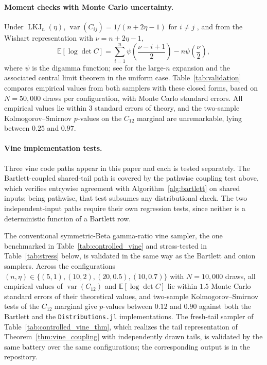 \documentclass[12pt,english]{article}
\theoremstyle{plain} %
\theoremstyle{definition} %
\theoremstyle{remark} %
\newcommand{\xthm}[2]{Theorem~\ref{#1}}
\newcommand{\xalg}[2]{Algorithm~\ref{#1}}
\newcommand{\xtab}[2]{Table~\ref{#1}}
\newcommand{\xtab}[2]{Table~#2 of the supplementary material}
\begin{document}
\paragraph{Moment checks with Monte Carlo uncertainty.}
Under $\operatorname{LKJ}_n(\eta)$, $\operatorname{var}(C_{ij})=1/(n+2\eta-1)$ for $i\neq j$ \citep[Proposition~1]{LewandowskiKurowickaJoe:2009}, and from the Wishart representation with $\nu=n+2\eta-1$,
$$
\mathbb{E}[\log\det C]=\sum_{i=1}^n\psi\left(\frac{\nu-i+1}{2}\right)-n\psi\left(\frac{\nu}{2}\right),
$$
where $\psi$ is the digamma function; see \citet{Hansen:CorrelationMatrix} for the large-$n$ expansion and the associated central limit theorem in the uniform case. Table~\ref{tab:validation} compares empirical values from both samplers with these closed forms, based on $N=50{,}000$ draws per configuration, with Monte Carlo standard errors. All empirical values lie within $3$ standard errors of theory, and the two-sample Kolmogorov--Smirnov $p$-values on the $C_{12}$ marginal are unremarkable, lying between $0.25$ and $0.97$.

\paragraph{Vine implementation tests.}
Three vine code paths appear in this paper and each is tested separately. The Bartlett-coupled shared-tail path is covered by the pathwise coupling test above, which verifies entrywise agreement with \xalg{alg:bartlett}{1} on shared inputs; being pathwise, that test subsumes any distributional check. The two independent-input paths require their own regression tests, since neither is a deterministic function of a Bartlett row.

The conventional symmetric-Beta gamma-ratio vine sampler, the one benchmarked in \xtab{tab:controlled_vine}{4} and stress-tested in Table~\ref{tab:stress} below, is validated in the same way as the Bartlett and onion samplers. Across the configurations $(n,\eta)\in\{(5,1),(10,2),(20,0.5),(10,0.7)\}$ with $N=10{,}000$ draws, all empirical values of $\operatorname{var}(C_{12})$ and $\mathbb{E}[\log\det C]$ lie within $1.5$ Monte Carlo standard errors of their theoretical values, and two-sample Kolmogorov--Smirnov tests of the $C_{12}$ marginal give $p$-values between $0.12$ and $0.90$ against both the Bartlett and the \texttt{Distributions.jl} implementations. The fresh-tail sampler of \xtab{tab:controlled_vine_thm}{3}, which realizes the tail representation of \xthm{thm:vine_coupling}{2} with independently drawn tails, is validated by the same battery over the same configurations; the corresponding output is in the repository.
\end{document}
